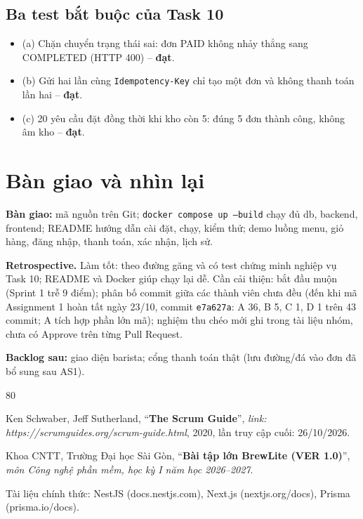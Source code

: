 \documentclass[a4paper]{article}
\begin{document}
\subsection{Ba test bắt buộc của Task 10}
\begin{itemize}\setlength{\itemsep}{0pt}\setlength{\parskip}{0pt}
    \item (a) Chặn chuyển trạng thái sai: đơn PAID không nhảy thẳng sang COMPLETED (HTTP 400) -- \textbf{đạt}.
    \item (b) Gửi hai lần cùng \texttt{Idempotency-Key} chỉ tạo một đơn và không thanh toán lần hai -- \textbf{đạt}.
    \item (c) 20 yêu cầu đặt đồng thời khi kho còn 5: đúng 5 đơn thành công, không âm kho -- \textbf{đạt}.
\end{itemize}

\section{Bàn giao và nhìn lại}
\textbf{Bàn giao:} mã nguồn trên Git; \texttt{docker compose up --build} chạy đủ db, backend, frontend; README hướng dẫn cài đặt, chạy, kiểm thử; demo luồng menu, giỏ hàng, đăng nhập, thanh toán, xác nhận, lịch sử.

\textbf{Retrospective.} Làm tốt: theo đường găng và có test chứng minh nghiệp vụ Task 10; README và Docker giúp chạy lại dễ. Cần cải thiện: bắt đầu muộn (Sprint 1 trễ 9 điểm); phân bố commit giữa các thành viên chưa đều (đến khi mã Assignment 1 hoàn tất ngày 23/10, commit \texttt{e7a627a}: A 36, B 5, C 1, D 1 trên 43 commit; A tích hợp phần lớn mã); nghiệm thu chéo mới ghi trong tài liệu nhóm, chưa có Approve trên từng Pull Request.

\textbf{Backlog sau:} giao diện barista; cổng thanh toán thật (lưu đường/đá vào đơn đã bổ sung sau AS1).

{\small
\begin{thebibliography}{80}

Ken Schwaber, Jeff Sutherland,
``\textbf{The Scrum Guide}'',
\textit{link: https://scrumguides.org/scrum-guide.html}, 2020, lần truy cập cuối: 26/10/2026.

Khoa CNTT, Trường Đại học Sài Gòn, ``\textbf{Bài tập lớn BrewLite (VER 1.0)}'', \textit{môn Công nghệ phần mềm, học kỳ I năm học 2026--2027}.

Tài liệu chính thức: NestJS (docs.nestjs.com), Next.js (nextjs.org/docs), Prisma (prisma.io/docs).

\end{thebibliography}}
\end{document}
